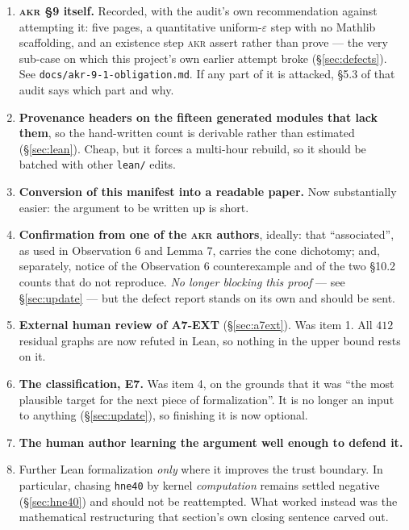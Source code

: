 \documentclass[11pt,a4paper]{article}
\theoremstyle{plain}
\theoremstyle{definition}
\theoremstyle{remark}
\begin{document}
\begin{enumerate}[leftmargin=*]
    \S9 is still an import. A point can lie on no crossing pair at all, so the
    pair bound does not bound points; and overlapping sides make the
    intersection infinite, where \texttt{Set.ncard} is $0$ and any bound is
    vacuous. Finiteness must be hypothesis or conclusion, never assumed.
  \item \textbf{\textsc{akr} \S9 itself.} Recorded, with the audit's own
    recommendation against attempting it: five pages, a quantitative uniform-$\varepsilon$
    step with no Mathlib scaffolding, and an existence step \textsc{akr} assert
    rather than prove --- the very sub-case on which this project's own earlier
    attempt broke (\S\ref{sec:defects}). See
    \texttt{docs/akr-9-1-obligation.md}. If any part of it is attacked, \S5.3 of
    that audit says which part and why.
  \item \textbf{Provenance headers on the fifteen generated modules that lack
    them}, so the hand-written count is derivable rather than estimated
    (\S\ref{sec:lean}). Cheap, but it forces a multi-hour rebuild, so it should
    be batched with other \texttt{lean/} edits.
  \item \textbf{Conversion of this manifest into a readable paper.} Now
    substantially easier: the argument to be written up is short.
  \item \textbf{Confirmation from one of the \textsc{akr} authors}, ideally: that
    ``associated'', as used in Observation 6 and Lemma 7, carries the cone
    dichotomy; and, separately, notice of the Observation 6 counterexample and of
    the two \S10.2 counts that do not reproduce. \emph{No longer blocking this
    proof} --- see \S\ref{sec:update} --- but the defect report stands on its own
    and should be sent.
  \item \textbf{External human review of \textsf{A7-EXT}} (\S\ref{sec:a7ext}).
    Was item 1. All $412$ residual graphs are now refuted in Lean, so nothing in
    the upper bound rests on it.
  \item \textbf{The classification, \textsf{E7}.} Was item 4, on the grounds
    that it was ``the most plausible target for the next piece of
    formalization''. It is no longer an input to anything
    (\S\ref{sec:update}), so finishing it is now optional.
  \item \textbf{The human author learning the argument well enough to defend
    it.}
  \item Further Lean formalization \emph{only} where it improves the trust
    boundary. In particular, chasing \texttt{hne40} by kernel \emph{computation}
    remains settled negative (\S\ref{sec:hne40}) and should not be reattempted.
    What worked instead was the mathematical restructuring that section's own
    closing sentence carved out.
\end{enumerate}
\end{document}
